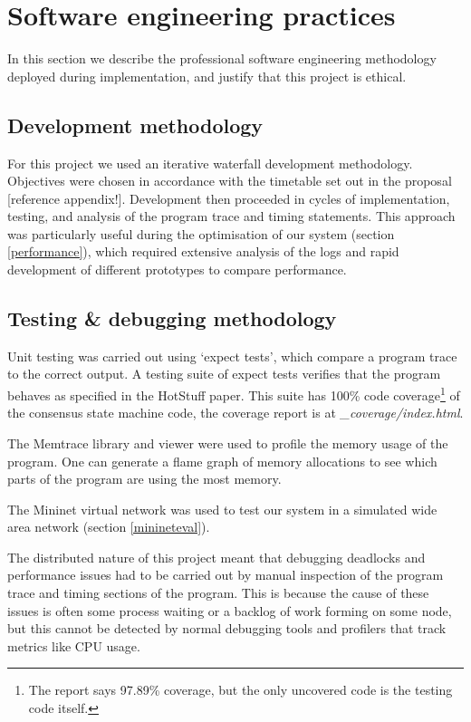 \section{Software engineering practices} \label{softwareeng}

In this section we describe the professional software engineering methodology deployed during implementation, and justify that this project is ethical.

\subsection{Development methodology} \label{devmethods}

For this project we used an iterative waterfall development methodology. Objectives were chosen in accordance with the timetable set out in the proposal [reference appendix!]. Development then proceeded in cycles of implementation, testing, and analysis of the program trace and timing statements. This approach was particularly useful during the optimisation of our system (section \ref{performance}), which required extensive analysis of the logs and rapid development of different prototypes to compare performance.

\subsection{Testing \& debugging methodology} \label{testing}

Unit testing was carried out using `expect tests', which compare a program trace to the correct output. A testing suite of expect tests verifies that the program behaves as specified in the HotStuff paper. This suite has 100\% code coverage\footnote{The report says 97.89\% coverage, but the only uncovered code is the testing code itself.} of the consensus state machine code, the coverage report is at \textit{\_coverage/index.html}.

The Memtrace library and viewer \cite{memtrace} were used to profile the memory usage of the program. One can generate a flame graph of memory allocations to see which parts of the program are using the most memory.

The Mininet virtual network \cite{mininet,lantzNetworkLaptopRapid2010} was used to test our system in a simulated wide area network (section \ref{minineteval}).

The distributed nature of this project meant that debugging deadlocks and performance issues had to be carried out by manual inspection of the program trace and timing sections of the program. This is because the cause of these issues is often some process waiting or a backlog of work forming on some node, but this cannot be detected by normal debugging tools and profilers that track metrics like CPU usage.

